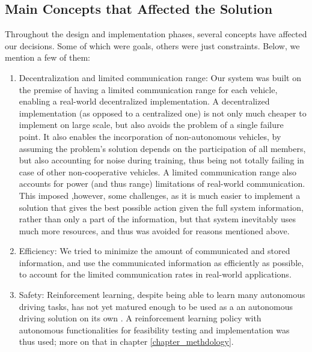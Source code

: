 \subsection{Main Concepts that Affected the Solution}
Throughout the design and implementation phases, several concepts have affected our decisions. Some of which were goals, others were just constraints. Below, we mention a few of them:
\begin{enumerate}
    \item Decentralization and limited communication range: Our system was built on the premise of having a limited communication range for each vehicle, enabling a real-world decentralized implementation. A decentralized implementation (as opposed to a centralized one) is not only much cheaper to implement on large scale, but also avoids the problem of a single failure point. It also enables the incorporation of non-autonomous vehicles, by assuming the problem's solution depends on the participation of all members, but also accounting for noise during training, thus being not totally failing in case of other non-cooperative vehicles. A limited communication range also accounts for power (and thus range) limitations of real-world communication. This imposed ,however, some challenges, as it is much easier to implement a solution that gives the best possible action given the full system information, rather than only a part of the information, but that system inevitably uses much more resources, and thus was avoided for reasons mentioned above.
    
    \item Efficiency: We tried to minimize the amount of communicated and stored information, and use the communicated information as efficiently as possible, to account for the limited communication rates in real-world applications.
    
    \item Safety: Reinforcement learning, despite being able to learn many autonomous driving tasks, has not yet matured enough to be used as a an autonomous driving solution on its own \cite{rl_auto_safety}. A reinforcement learning policy with autonomous functionalities for feasibility testing and implementation was thus used; more on that in chapter \ref{chapter_methdology}.
    
\end{enumerate}









